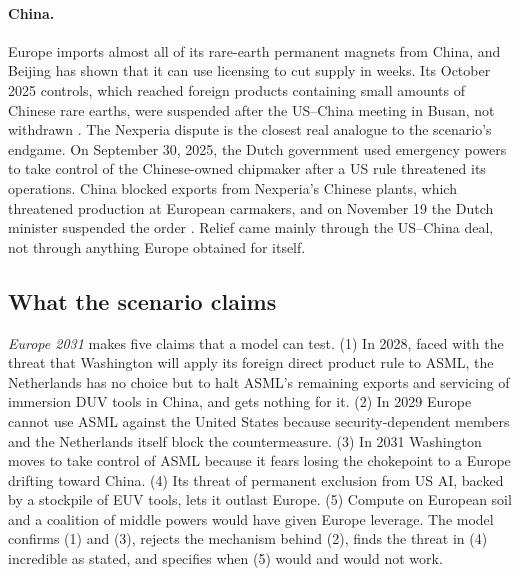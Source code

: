 \paragraph{China.} Europe imports almost all of its rare-earth permanent magnets from China, and Beijing has shown that it can use licensing to cut supply in weeks. Its October 2025 controls, which reached foreign products containing small amounts of Chinese rare earths, were suspended after the US--China meeting in Busan, not withdrawn \citep{mofcom2025suspension}. The Nexperia dispute is the closest real analogue to the scenario's endgame. On September 30, 2025, the Dutch government used emergency powers to take control of the Chinese-owned chipmaker after a US rule threatened its operations. China blocked exports from Nexperia's Chinese plants, which threatened production at European carmakers, and on November 19 the Dutch minister suspended the order \citep{taylorwessing2025nexperia}. Relief came mainly through the US--China deal, not through anything Europe obtained for itself.

\subsection{What the scenario claims}

\emph{Europe 2031} makes five claims that a model can test. (1) In 2028, faced with the threat that Washington will apply its foreign direct product rule to ASML, the Netherlands has no choice but to halt ASML's remaining exports and servicing of immersion DUV tools in China, and gets nothing for it. (2) In 2029 Europe cannot use ASML against the United States because security-dependent members and the Netherlands itself block the countermeasure. (3) In 2031 Washington moves to take control of ASML because it fears losing the chokepoint to a Europe drifting toward China. (4) Its threat of permanent exclusion from US AI, backed by a stockpile of EUV tools, lets it outlast Europe. (5) Compute on European soil and a coalition of middle powers would have given Europe leverage. The model confirms (1) and (3), rejects the mechanism behind (2), finds the threat in (4) incredible as stated, and specifies when (5) would and would not work.
